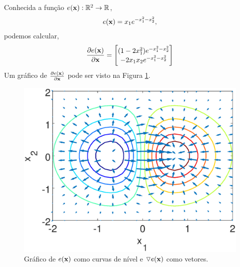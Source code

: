 \noindent
\begin{minipage}{0.5\textwidth}
\begin{example}
Conhecida a função $e(\VECTOR{x}): \mathbb{R}^2 \rightarrow \mathbb{R}$, 
\begin{equation}
e(\VECTOR{x})=x_1 e^{-x_1^2 - x_2^2},
\end{equation}
podemos calcular,
\begin{equation}
\frac{\partial e(\VECTOR{x}) }{\partial \VECTOR{x}}=
\begin{bmatrix}
(1-2 x_1^2) e^{-x_1^2 - x_2^2}\\
-2 x_1 x_2 e^{-x_1^2 - x_2^2}
\end{bmatrix}
\end{equation}
Um gráfico de $\frac{\partial e(\VECTOR{x}) }{\partial \VECTOR{x}}$ pode ser visto na Figura \ref{fig:ex:gradient}.
\end{example}
\end{minipage}
\begin{minipage}{0.45\textwidth}
    \begin{figure}[H]
	\centering
        \includegraphics[width=\textwidth]{chapters/derivada/mfiles/gradiente/gradient.eps}
        \caption{Gráfico de $e(\VECTOR{x})$ como curvas de nível e $\triangledown e(\VECTOR{x})$ como vetores.}
        \label{fig:ex:gradient}
    \end{figure}
\end{minipage}


